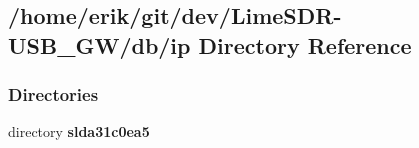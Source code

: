 \subsection{/home/erik/git/dev/\+Lime\+S\+D\+R-\/\+U\+S\+B\+\_\+\+G\+W/db/ip Directory Reference}
\label{dir_5b698e1ff8cb105b9a4072ac6c2bfbd3}
\subsubsection*{Directories}
\begin{DoxyCompactItemize}
\item 
directory {\bf slda31c0ea5}
\end{DoxyCompactItemize}
